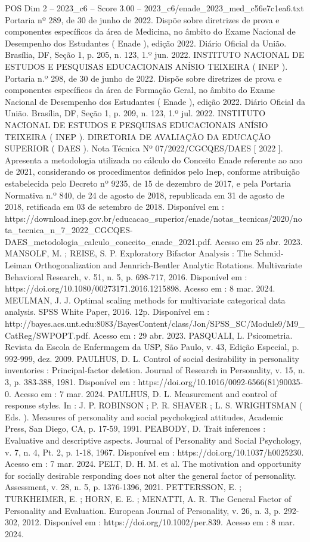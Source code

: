 \begin{textsample}{POS Dim 2 – 2023\_c6 – Score 3.00 – 2023\_c6/enade\_2023\_med\_c56e7c1ea6.txt}
Portaria nº 289, de 30 de junho de 2022.
Dispõe sobre diretrizes de prova e componentes específicos da área de Medicina, no âmbito do Exame Nacional de Desempenho dos Estudantes ( Enade ), edição 2022.
Diário Oficial da União.
Brasília, DF, Seção 1, p. 205, n. 123, 1.º jun. 2022.
INSTITUTO NACIONAL DE ESTUDOS E PESQUISAS EDUCACIONAIS ANÍSIO TEIXEIRA ( INEP ).
Portaria n.º 298, de 30 de junho de 2022.
Dispõe sobre diretrizes de prova e componentes específicos da área de Formação Geral, no âmbito do Exame Nacional de Desempenho dos Estudantes ( Enade ), edição 2022.
Diário Oficial da União.
Brasília, DF, Seção 1, p. 209, n. 123, 1.º jul. 2022.
INSTITUTO NACIONAL DE ESTUDOS E PESQUISAS EDUCACIONAIS ANÍSIO TEIXEIRA ( INEP ).
DIRETORIA DE AVALIAÇÃO DA EDUCAÇÃO SUPERIOR ( DAES ).
Nota Técnica Nº 07/2022/CGCQES/DAES [ 2022 ].
Apresenta a metodologia utilizada no cálculo do Conceito Enade referente ao ano de 2021, considerando os procedimentos definidos pelo Inep, conforme atribuição estabelecida pelo Decreto nº 9235, de 15 de dezembro de 2017, e pela Portaria Normativa n.º 840, de 24 de agosto de 2018, republicada em 31 de agosto de 2018, retificada em 03 de setembro de 2018.
Disponível em : https://download.inep.gov.br/educacao\_superior/enade/notas\_tecnicas/2020/nota\_tecnica\_n\_7\_2022\_CGCQES-DAES\_metodologia\_calculo\_conceito\_enade\_2021.pdf.
Acesso em 25 abr. 2023.
MANSOLF, M. ; REISE, S.
P.
Exploratory Bifactor Analysis : The Schmid-Leiman Orthogonalization and Jennrich-Bentler Analytic Rotations.
Multivariate Behavioral Research, v. 51, n. 5, p. 698-717, 2016.
Disponível em : https://doi.org/10.1080/00273171.2016.1215898.
Acesso em : 8 mar. 2024.
MEULMAN, J.
J.
Optimal scaling methods for multivariate categorical data analysis.
SPSS White Paper, 2016. 12p.
Disponível em : http://bayes.acs.unt.edu:8083/BayesContent/class/Jon/SPSS\_SC/Module9/M9\_CatReg/SWPOPT.pdf.
Acesso em : 29 abr. 2023.
PASQUALI, L.
Psicometria.
Revista da Escola de Enfermagem da USP, São Paulo, v. 43, Edição Especial, p. 992-999, dez. 2009.
PAULHUS, D.
L.
Control of social desirability in personality inventories : Principal-factor deletion.
Journal of Research in Personality, v. 15, n. 3, p. 383-388, 1981.
Disponível em : https://doi.org/10.1016/0092-6566(81)90035-0.
Acesso em : 7 mar. 2024.
PAULHUS, D.
L.
Measurement and control of response styles.
In : J.
P.
ROBINSON ; P.
R.
SHAVER ; L.
S.
WRIGHTSMAN ( Eds. ).
Measures of personality and social psychological attitudes, Academic Press, San Diego, CA, p. 17-59, 1991.
PEABODY, D.
Trait inferences : Evaluative and descriptive aspects.
Journal of Personality and Social Psychology, v. 7, n. 4, Pt. 2, p. 1-18, 1967.
Disponível em : https://doi.org/10.1037/h0025230.
Acesso em : 7 mar. 2024.
PELT, D.
H.
M. et al.
The motivation and opportunity for socially desirable responding does not alter the general factor of personality.
Assessment, v. 28, n. 5, p. 1376-1396, 2021.
PETTERSSON, E. ; TURKHEIMER, E. ; HORN, E.
E. ; MENATTI, A.
R.
The General Factor of Personality and Evaluation.
European Journal of Personality, v. 26, n. 3, p. 292-302, 2012.
Disponível em : https://doi.org/10.1002/per.839.
Acesso em : 8 mar. 2024.

\end{textsample}
